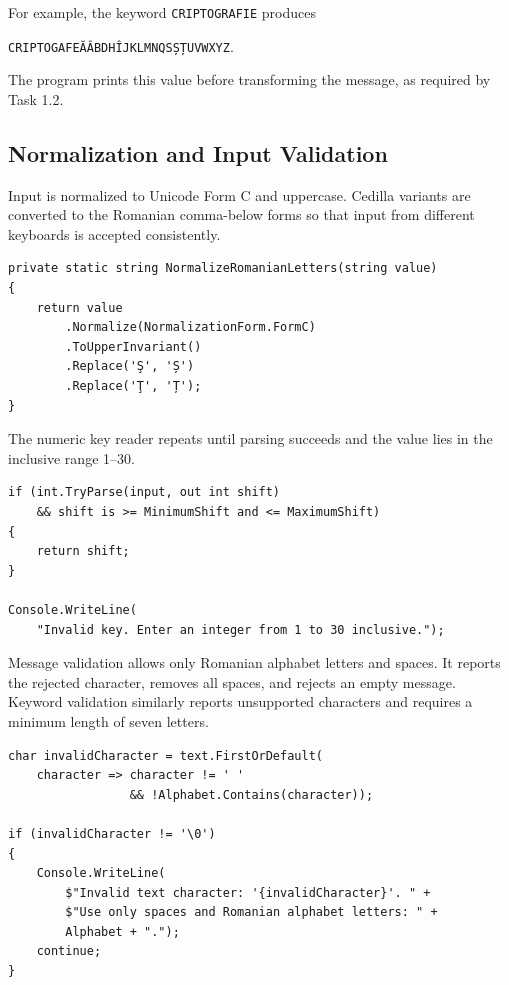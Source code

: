\documentclass[12pt,a4paper]{article}
\begin{document}
For example, the keyword \texttt{CRIPTOGRAFIE} produces

\begin{center}
\small\texttt{CRIPTOGAFEĂÂBDHÎJKLMNQSȘȚUVWXYZ}.
\end{center}

The program prints this value before transforming the message, as required by Task 1.2.

\subsection{Normalization and Input Validation}

Input is normalized to Unicode Form C and uppercase. Cedilla variants are converted to the Romanian comma-below forms so that input from different keyboards is accepted consistently.

\begin{lstlisting}[style=csharp,caption={Normalization of Romanian letters}]
private static string NormalizeRomanianLetters(string value)
{
    return value
        .Normalize(NormalizationForm.FormC)
        .ToUpperInvariant()
        .Replace('Ş', 'Ș')
        .Replace('Ţ', 'Ț');
}
\end{lstlisting}

The numeric key reader repeats until parsing succeeds and the value lies in the inclusive range 1--30.

\begin{lstlisting}[style=csharp,caption={Numeric-key validation}]
if (int.TryParse(input, out int shift)
    && shift is >= MinimumShift and <= MaximumShift)
{
    return shift;
}

Console.WriteLine(
    "Invalid key. Enter an integer from 1 to 30 inclusive.");
\end{lstlisting}

Message validation allows only Romanian alphabet letters and spaces. It reports the rejected character, removes all spaces, and rejects an empty message. Keyword validation similarly reports unsupported characters and requires a minimum length of seven letters.

\begin{lstlisting}[style=csharp,caption={Validation of message characters}]
char invalidCharacter = text.FirstOrDefault(
    character => character != ' '
                 && !Alphabet.Contains(character));

if (invalidCharacter != '\0')
{
    Console.WriteLine(
        $"Invalid text character: '{invalidCharacter}'. " +
        $"Use only spaces and Romanian alphabet letters: " +
        Alphabet + ".");
    continue;
}
\end{lstlisting}
\end{document}
